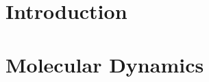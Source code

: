 \documentclass[12pt]{UoAthesis}
\begin{document}
%
%




\chapter{Introduction}

\chapter{Molecular Dynamics}
\end{document}
